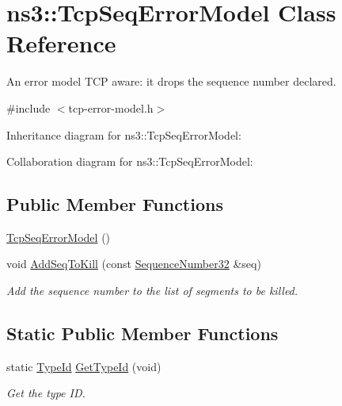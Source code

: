 \hypertarget{classns3_1_1TcpSeqErrorModel}{}\section{ns3\+:\+:Tcp\+Seq\+Error\+Model Class Reference}
\label{classns3_1_1TcpSeqErrorModel}


An error model T\+CP aware\+: it drops the sequence number declared.  




{\ttfamily \#include $<$tcp-\/error-\/model.\+h$>$}



Inheritance diagram for ns3\+:\+:Tcp\+Seq\+Error\+Model\+:


Collaboration diagram for ns3\+:\+:Tcp\+Seq\+Error\+Model\+:
\subsection*{Public Member Functions}
\begin{DoxyCompactItemize}
\item 
\hyperlink{classns3_1_1TcpSeqErrorModel_ace6771669b2da5304cf59aa19c33510c}{Tcp\+Seq\+Error\+Model} ()
\item 
void \hyperlink{classns3_1_1TcpSeqErrorModel_a5c414ce6277ae9ff84decb83a0847386}{Add\+Seq\+To\+Kill} (const \hyperlink{group__network_gacb2070e4e98d2d5135c9bede58f07a03}{Sequence\+Number32} \&seq)
\begin{DoxyCompactList}\small\item\em Add the sequence number to the list of segments to be killed. \end{DoxyCompactList}\end{DoxyCompactItemize}
\subsection*{Static Public Member Functions}
\begin{DoxyCompactItemize}
\item 
static \hyperlink{classns3_1_1TypeId}{Type\+Id} \hyperlink{classns3_1_1TcpSeqErrorModel_aa684de2006b55d00ea067fa79ce3e163}{Get\+Type\+Id} (void)
\begin{DoxyCompactList}\small\item\em Get the type ID. \end{DoxyCompactList}\end{DoxyCompactItemize}
